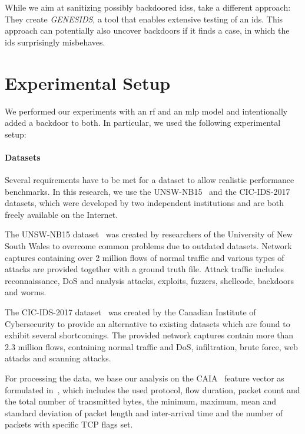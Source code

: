 \documentclass[9pt,sigconf,letterpaper,dvipsnames\ifx\removeHeaders\tempYes ,nonacm\fi]{acmart}
\newcommand\note[2]{{\color{#1}#2}}
\newcommand\todo[1]{{\note{red}{TODO: #1}}}
\newcommand{\unsw}{UNSW-NB15}
\newcommand{\cic}{CIC-IDS-2017}
\begin{document}
While we aim at sanitizing possibly backdoored \glspl{ids}, \cite{erlacher_how_2018} take a different approach: They create \textit{GENESIDS}, a tool that enables extensive testing of an \gls{ids}. This approach can potentially also uncover backdoors if it finds a case, in which the \gls{ids} surprisingly misbehaves. 

\section{Experimental Setup} \label{sec:ml_approaches}
We performed our experiments with an \gls{rf} and an \gls{mlp} model and intentionally added a backdoor to both. In particular, we used the following experimental setup:
\paragraph{Datasets}

Several requirements have to be met for a dataset to allow realistic performance benchmarks. %
In this research, we use the \unsw{}~\cite{moustafa_unsw-nb15:_2015} and the \cic{}~\cite{sharafaldin_toward_2018} datasets, which were developed by two independent institutions and are both freely available on the Internet. %

The \unsw{} dataset~\cite{moustafa_unsw-nb15:_2015} was created by researchers of the University of New South Wales to overcome common problems due to outdated datasets. Network captures containing over 2 million flows of normal traffic and various types of attacks are provided together with a ground truth file. Attack traffic includes reconnaissance, DoS and analysis attacks, exploits, fuzzers,  shellcode, backdoors and worms.

The \cic{} dataset~\cite{sharafaldin_toward_2018} was created by the Canadian Institute of Cybersecurity to provide an alternative to existing datasets which are found to exhibit several shortcomings. The provided network captures contain more than 2.3 million flows, containing normal traffic and DoS, infiltration,  brute force, web attacks and scanning attacks.

For processing the data, we base our analysis on the CAIA~\cite{williams_preliminary_2006} feature vector as formulated in~\cite{meghdouri_analysis_2018}, which includes the used protocol, flow duration, packet count and the total number of transmitted bytes, the minimum, maximum, mean and standard deviation of packet length and inter-arrival time and the number of packets with specific TCP flags set.
\end{document}
